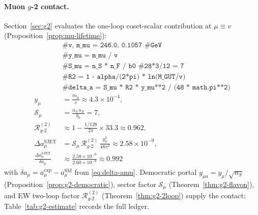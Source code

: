 \documentclass[11pt]{article}
\theoremstyle{plain}
\theoremstyle{definition}
\theoremstyle{remark}
\numberwithin{equation}{section}
\begin{document}
\paragraph{Muon $g$-2 contact.}
Section~\ref{sec:g2} evaluates the one-loop coset-scalar contribution at
$\mu\equiv v$ (Proposition~\ref{prop:mu-lifetime}):
\begin{equation}\label{eq:workbook-g2}
\begin{aligned}
  &\texttt{\# v, m\_mu = 246.0, 0.1057  \# GeV}\\
  &\texttt{\# y\_mu = m\_mu / v}\\
  &\texttt{\# S\_mu = n\_S * n\_F / b0  \# 28*3/12 = 7}\\
  &\texttt{\# R2 = 1 - alpha/(2*pi) * ln(M\_GUT/v)}\\
  &\texttt{\# delta\_a = S\_mu * R2 * y\_mu**2 / (48 * math.pi**2)}\\
  y_\mu &= \frac{m_\mu}{v}\approx 4.3\times 10^{-4},\\
  \mathcal{S}_\mu &= \frac{n_S\,n_F}{b_0}=7,\\
  \mathcal{R}_{g\text{-}2}^{(2)}
  &\approx 1-\frac{1/128}{2\pi}\times 33.3
  \approx 0.962,\\
  \Delta a_\mu^{\mathrm{SJET}}
  &= \mathcal{S}_\mu\,\mathcal{R}_{g\text{-}2}^{(2)}\,
  \frac{y_\mu^2}{48\pi^2}
  \approx 2.58\times 10^{-9},\\
  \frac{\Delta a_\mu^{\mathrm{SJET}}}{\delta a_\mu}
  &\approx \frac{2.58\times 10^{-9}}{2.60\times 10^{-9}}
  \approx 0.992
\end{aligned}
\end{equation}
with $\delta a_\mu=a_\mu^{\mathrm{exp}}-a_\mu^{\mathrm{SM}}$ from
\eqref{eq:delta-amu}. Democratic portal
$y_{\mu a}=y_\mu/\sqrt{n_S}$ (Proposition~\ref{prop:g2-democratic}),
sector factor $\mathcal{S}_\mu$ (Theorem~\ref{thm:g2-flavon}), and EW
two-loop factor $\mathcal{R}_{g\text{-}2}^{(2)}$ (Theorem~\ref{thm:g2-2loop})
supply the contact; Table~\ref{tab:g2-estimate} records the full ledger.
\end{document}
